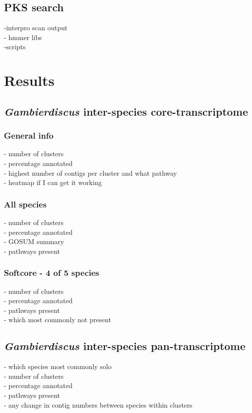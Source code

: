 \documentclass[12pt]{article}
\begin{document}
\subsection*{PKS search}
-interpro scan output \\
- hmmer libs \\
-scripts

\newpage
\section*{Results}
\FloatBarrier
\subsection*{\emph{Gambierdiscus} inter-species core-transcriptome}
\subsubsection*{General info}
- number of clusters\\
- percentage annotated \\
- highest number of contigs per cluster and what pathway\\
- heatmap if I can get it working
\subsubsection*{All species}
- number of clusters\\
- percentage annotated \\
- GOSUM summary \\
- pathways present
\subsubsection*{Softcore - 4 of 5 species}
- number of clusters\\
- percentage annotated \\
- pathways present\\
- which most commonly not present
\subsection*{\emph{Gambierdiscus} inter-species pan-transcriptome}
- which species most commonly solo\\
- number of clusters\\
- percentage annotated \\
- pathways present\\
- any change in contig numbers between species within clusters
\end{document}
